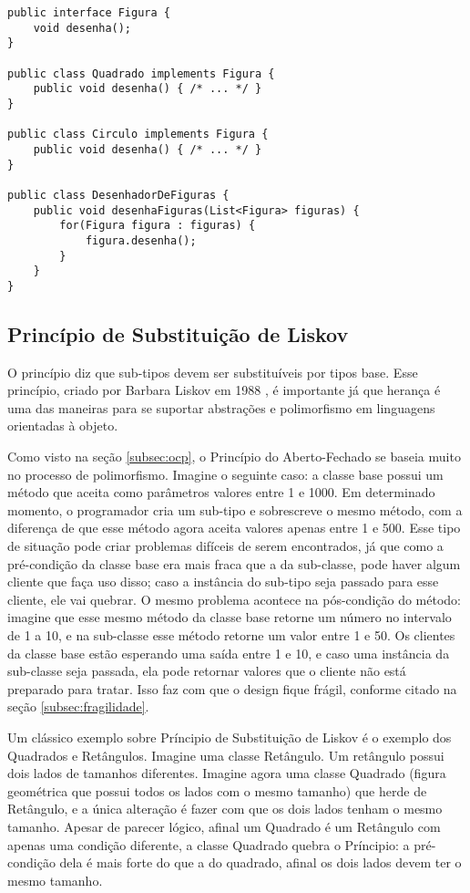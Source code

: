 \begin{lstlisting}[frame=trbl]
public interface Figura {
	void desenha();
}

public class Quadrado implements Figura {
	public void desenha() { /* ... */ }
}

public class Circulo implements Figura {
	public void desenha() { /* ... */ }
}

public class DesenhadorDeFiguras {
	public void desenhaFiguras(List<Figura> figuras) {
		for(Figura figura : figuras) {
			figura.desenha();
		}
	}
}
\end{lstlisting}

\subsection{Princípio de Substituição de Liskov}
\label{subsec:lsp}

O princípio diz que sub-tipos devem ser substituíveis por tipos base. Esse princípio, criado por Barbara Liskov em 1988 \cite{liskov},
é importante já que herança é uma das maneiras para se suportar abstrações e polimorfismo em linguagens orientadas à objeto.

Como visto na seção \ref{subsec:ocp}, o Princípio do Aberto-Fechado se baseia muito no processo de polimorfismo. Imagine o seguinte caso:
a classe base possui um método que aceita como parâmetros valores entre 1 e 1000. Em determinado momento, o programador cria um sub-tipo
e sobrescreve o mesmo método, com a diferença de que esse método agora aceita valores apenas entre 1 e 500. Esse tipo de situação pode
criar problemas difíceis de serem encontrados, já que como a pré-condição da classe base era mais fraca que a da sub-classe, pode haver
algum cliente que faça uso disso; caso a instância do sub-tipo seja passado para esse cliente, ele vai quebrar. O mesmo problema
acontece na pós-condição do método: imagine que esse mesmo método da classe base retorne um número no intervalo de 1 a 10, e na sub-classe
esse método retorne um valor entre 1 e 50. Os clientes da classe base estão esperando uma saída entre 1 e 10, e caso uma instância da
sub-classe seja passada, ela pode retornar valores que o cliente não está preparado para tratar. Isso faz com que o design fique frágil, 
conforme citado na seção \ref{subsec:fragilidade}.  

Um clássico exemplo sobre Príncipio de Substituição de Liskov é o exemplo dos Quadrados e Retângulos. Imagine uma classe Retângulo. Um
retângulo possui dois lados de tamanhos diferentes. Imagine agora uma classe Quadrado (figura geométrica que possui todos os lados
com o mesmo tamanho) que herde de Retângulo, e a única alteração é fazer com que os dois lados tenham o mesmo tamanho. Apesar
de parecer lógico, afinal um Quadrado é um Retângulo com apenas uma condição diferente, a classe Quadrado quebra o Príncipio:
a pré-condição dela é mais forte do que a do quadrado, afinal os dois lados devem ter o mesmo tamanho. 

